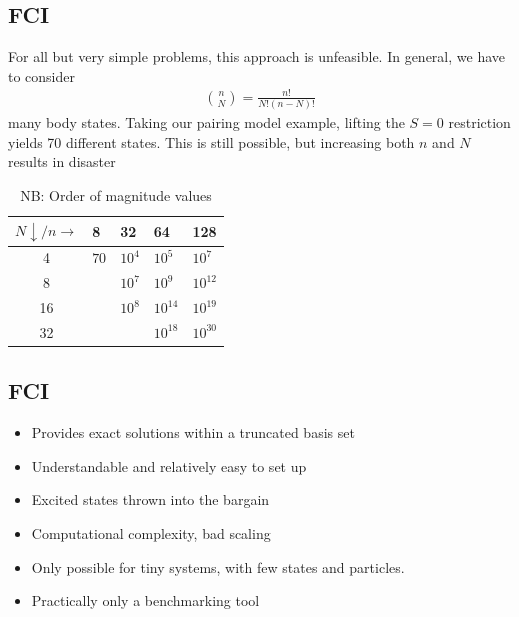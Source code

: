 \documentclass[
11pt,notheorems,hyperref={pdfauthor=whatever}
]{beamer}
\begin{document}
\subsection{FCI}
\begin{frame}
    For all but very simple problems, this approach is unfeasible. In general, we have to consider 
    \begin{align*}
        \binom{n}{N} = \frac{n!}{N!(n-N)!}
    \end{align*}
    many body states. Taking our pairing model example, lifting the $S = 0$ restriction yields 70 different states. This is still possible, but increasing both $n$ and $N$ results in disaster
    
    \begin{table}
        \begin{tabular}{c|l|l|l|l}
        $N \downarrow /n \rightarrow$ & 8    & 32       & 64        & 128       \\
        \hline
        4     & $70$ & $10^{4}$ & $10^{5}$  & $10^{7}$  \\
        8     &      & $10^{7}$ & $10^{9}$  & $10^{12}$ \\
        16    &      & $10^{8}$ & $10^{14}$ & $10^{19}$ \\
        32    &      &          & $10^{18}$ & $10^{30}$
        \end{tabular}
        \caption{NB: Order of magnitude values}
    \end{table}
\end{frame}

\subsection{FCI}
\begin{frame}
    \textcolor{Green}{}
    \begin{itemize}
        \item Provides exact solutions within a truncated basis set
        \item Understandable and relatively easy to set up 
        \item Excited states thrown into the bargain
    \end{itemize}
    \vspace{20px}
    \textcolor{Red}{}
    \begin{itemize}
        \item Computational complexity, bad scaling
        \item Only possible for tiny systems, with few states and particles.
        \item Practically only a benchmarking tool
    \end{itemize}
\end{frame}
\end{document}
